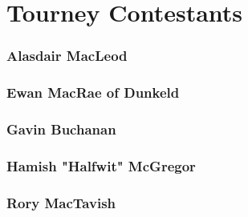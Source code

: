 \chapter*{Tourney Contestants}
\subsection{Alasdair MacLeod}

\vfill\eject
\subsection{Ewan MacRae of Dunkeld}

\vfill\eject
\subsection{Gavin Buchanan}

\vfill\eject
\subsection{Hamish "Halfwit" McGregor}

\vfill\eject
\subsection{Rory MacTavish}
